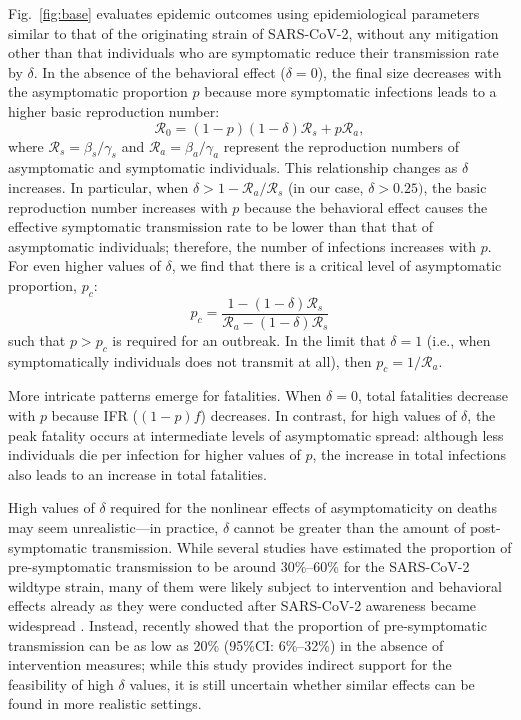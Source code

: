 \documentclass[12pt]{article}
\newcommand{\fref}[1]{Fig.~\ref{fig:#1}}
\newcommand{\RR}{\ensuremath{{\mathcal R}}\xspace}
\begin{document}
\fref{base} evaluates epidemic outcomes using epidemiological parameters similar to that of the originating strain of SARS-CoV-2, without any mitigation other than that individuals who are symptomatic reduce their transmission rate by $\delta$. 
In the absence of the behavioral effect ($\delta=0$), the final size decreases with the asymptomatic proportion $p$ because more symptomatic infections leads to a higher basic reproduction number:
\begin{equation}
\RR_0 = (1-p) (1-\delta) \RR_s + p \RR_a,
\end{equation}
where $\RR_s = \beta_s/\gamma_s$ and $\RR_a = \beta_a/\gamma_a$ represent the reproduction numbers of asymptomatic and symptomatic individuals.
This relationship changes as $\delta$ increases.
In particular, when $\delta > 1-\RR_a/\RR_s$ (in our case, $\delta > 0.25)$, the basic reproduction number increases with $p$ because the behavioral effect causes the effective symptomatic transmission rate to be lower than that that of asymptomatic individuals;
therefore, the number of infections increases with $p$.
For even higher values of $\delta$, we find that there is a critical level of asymptomatic proportion, $p_c$:
\begin{equation}
    p_c = \frac{1 - (1-\delta) \RR_s}{\RR_a - (1-\delta) \RR_s}
\end{equation}
such that $p>p_c$ is required for an outbreak. 
In the limit that $\delta=1$ (i.e., when symptomatically individuals does not transmit at all), then $p_c=1/\RR_a$.

More intricate patterns emerge for fatalities.
When $\delta = 0$, total fatalities decrease with $p$ because IFR ($(1-p)f$) decreases.
In contrast, for high values of $\delta$, the peak fatality occurs at intermediate levels of asymptomatic spread:
although less individuals die per infection for higher values of $p$, the increase in total infections also leads to an increase in total fatalities.

High values of $\delta$ required for the nonlinear effects of asymptomaticity on deaths may seem unrealistic---in practice, $\delta$ cannot be greater than the amount of post-symptomatic transmission.
While several studies have estimated the proportion of pre-symptomatic transmission to be around 30\%--60\% for the SARS-CoV-2 wildtype strain, many of them were likely subject to intervention and behavioral effects already as they were conducted after SARS-CoV-2 awareness became widespread \citep{he2020temporal}.
Instead, \cite{sender2021unmitigated} recently showed that the proportion of pre-symptomatic transmission can be as low as 20\% (95\%CI: 6\%--32\%) in the absence of intervention measures;
while this study provides indirect support for the feasibility of high $\delta$ values, it is still uncertain whether similar effects can be found in more realistic settings.
\end{document}
